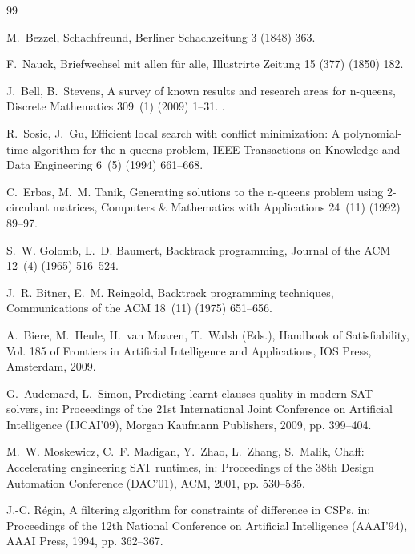 \documentclass[a4paper,fleqn]{cas-sc}
\begin{document}
\begin{thebibliography}{99}

M.~Bezzel, Schachfreund, Berliner Schachzeitung 3 (1848) 363.

F.~Nauck, Briefwechsel mit allen f{\"u}r alle, Illustrirte Zeitung 15 (377) (1850) 182.

J.~Bell, B.~Stevens, A survey of known results and research areas for n-queens, Discrete Mathematics 309~(1) (2009) 1--31.
\newblock \href {https://doi.org/10.1016/j.disc.2007.12.043} {}.

R.~Sosic, J.~Gu, Efficient local search with conflict minimization: A polynomial-time algorithm for the n-queens problem, IEEE Transactions on Knowledge and Data Engineering 6~(5) (1994) 661--668.

C.~Erbas, M.~M. Tanik, Generating solutions to the n-queens problem using 2-circulant matrices, Computers \& Mathematics with Applications 24~(11) (1992) 89--97.

S.~W. Golomb, L.~D. Baumert, Backtrack programming, Journal of the ACM 12~(4) (1965) 516--524.

J.~R. Bitner, E.~M. Reingold, Backtrack programming techniques, Communications of the ACM 18~(11) (1975) 651--656.

A.~Biere, M.~Heule, H.~van Maaren, T.~Walsh (Eds.), Handbook of Satisfiability, Vol. 185 of Frontiers in Artificial Intelligence and Applications, IOS Press, Amsterdam, 2009.

G.~Audemard, L.~Simon, Predicting learnt clauses quality in modern SAT solvers, in: Proceedings of the 21st International Joint Conference on Artificial Intelligence (IJCAI'09), Morgan Kaufmann Publishers, 2009, pp. 399--404.

M.~W. Moskewicz, C.~F. Madigan, Y.~Zhao, L.~Zhang, S.~Malik, Chaff: Accelerating engineering SAT runtimes, in: Proceedings of the 38th Design Automation Conference (DAC'01), ACM, 2001, pp. 530--535.

J.-C. R{\'e}gin, A filtering algorithm for constraints of difference in CSPs, in: Proceedings of the 12th National Conference on Artificial Intelligence (AAAI'94), AAAI Press, 1994, pp. 362--367.


\end{thebibliography}
\end{document}
